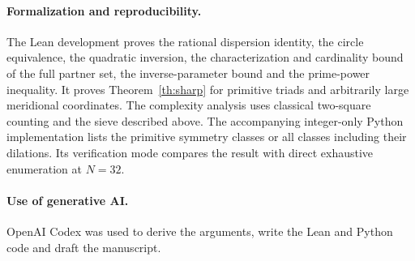 \documentclass[11pt]{article}
\begin{document}
\paragraph{Formalization and reproducibility.}
The Lean development proves the rational dispersion identity, the circle equivalence, the quadratic inversion, the characterization and cardinality bound of the full partner set, the inverse-parameter bound and the prime-power inequality. It proves Theorem~\ref{th:sharp} for primitive triads and arbitrarily large meridional coordinates. The complexity analysis uses classical two-square counting and the sieve described above. The accompanying integer-only Python implementation lists the primitive symmetry classes or all classes including their dilations. Its verification mode compares the result with direct exhaustive enumeration at $N=32$.

\paragraph{Use of generative AI.} OpenAI Codex was used to derive the arguments, write the Lean and Python code and draft the manuscript.
\end{document}
